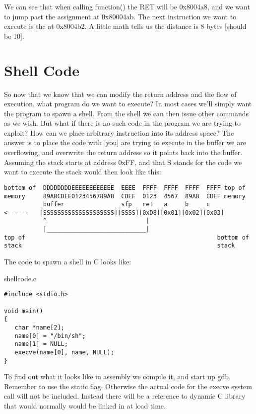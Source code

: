 \documentclass[10pt]{article}
\begin{document}
We can see that when calling function() the RET will be 0x8004a8, and we want to jump past the assignment at 
0x80004ab. The next instruction we want to execute is the at 0x8004b2. A little math tells us the distance is 8 
bytes [should be 10]. 

\section{Shell Code}

So now that we know that we can modify the return address and the flow of execution, what program do we 
want to execute? In most cases we'll simply want the program to spawn a shell. From the shell we can then issue 
other commands as we wish. But what  if there is no such code in the program we are trying to exploit? How can 
we place arbitrary instruction into its address space? The answer is to place the code with [you] are trying to 
execute in the buffer we are overflowing, and overwrite the return address so it points back into the buffer. 
Assuming the stack starts at address 0xFF, and that S stands for the code we want to execute the stack would 
then look like this:

{\scriptsize
\begin{verbatim}
bottom of  DDDDDDDDEEEEEEEEEEEE  EEEE  FFFF  FFFF  FFFF  FFFF top of
memory     89ABCDEF0123456789AB  CDEF  0123  4567  89AB  CDEF memory           
           buffer                sfp   ret   a     b     c
<------   [SSSSSSSSSSSSSSSSSSSS][SSSS][0xD8][0x01][0x02][0x03]
           ^                            |
           |____________________________|
top of                                                      bottom of
stack                                                       stack
\end{verbatim}
}
  

The code to spawn a shell in C looks like:

shellcode.c

\begin{lstlisting}
#include <stdio.h>

void main() 
{
   char *name[2];
   name[0] = "/bin/sh";
   name[1] = NULL;
   execve(name[0], name, NULL);
}
\end{lstlisting}

To find out what it looks like in assembly we compile it, and start up gdb. Remember to use the  static flag. 
Otherwise the actual code  for the execve system call will not be included. Instead there will be a reference to 
dynamic C library that would normally would be linked in at load time. 
\end{document}
